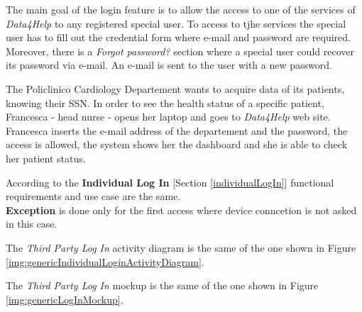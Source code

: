 The main goal of the login feature is to allow the access to one of the services of \textit{Data4Help} to any registered special user. To access to tjhe services the special user has to fill out the credential form where e-mail and password are required. Moreover, there is a \textit{Forgot password?} section where a special user could recover its password via e-mail. An e-mail is sent to the user with a new password.

The Policlinico Cardiology Departement wants to acquire data of its patients, knowing their SSN.
In order to see the health status of a specific patient, Francesca - head nurse - opens her laptop and goes to \textit{Data4Help} web site.
Francesca inserts the e-mail address of the departement and the password, the access is allowed, the system shows her the dashboard and she is able to check her patient status.

According to the \textbf{Individual Log In} [Section \ref{individualLogIn}] functional requirements and use case are the same.\\
\textbf{Exception} is done only for the first access where device conncetion is not asked in this case.

The \textit{Third Party Log In} activity diagram is the same of the one shown in Figure \ref{img:genericIndividualLoginActivityDiagram}.

The \textit{Third Party Log In} mockup is the same of the one shown in Figure \ref{img:genericLogInMockup}.
